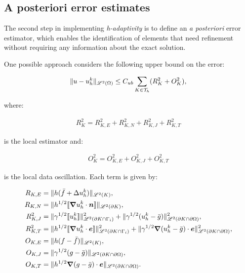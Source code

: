 \newpage
\subsection{A posteriori error estimates}

The second step in implementing \textit{h-adaptivity} is to define an \textit{a posteriori} error estimator, which enables the identification of elements that need refinement without requiring any information about the exact solution.

\cite{Cangiani2023} One possible approach considers the following upper bound on the error:

\begin{gather}
	\lVert u - u^k_h \rVert_{\mathscr{L}^2(\Omega)} \leq C_{ub} \sum_{K \in \mathcal{T}_h} (R_K^2 + O_K^2),
\end{gather}

where:

\begin{gather}
	R_K^2 = R_{K, E}^2 + R_{K, N}^2 + R_{K, J}^2 + R_{K, T}^2
\end{gather}

is the local estimator and:

\begin{gather}
	O_K^2 = O_{K, E}^2 + O_{K, J}^2 + O_{K, T}^2
\end{gather}

is the local data oscillation. Each term is given by:

\begin{align}
	R_{K, E} &= \lVert h (\bar{f} + \Delta u^k_h) \rVert_{\mathscr{L}^2(K)}, \\
	R_{K, N} &= \lVert h^{1/2} \llbracket \bm{\nabla} u^k_h \cdot \bm{n} \rrbracket \rVert_{\mathscr{L}^2(\partial K)}, \\
	R^2_{K, J} &= \lVert \gamma^{1/2} \llbracket u^k_h \rrbracket \rVert^2_{\mathscr{L}^2(\partial K \cap \Gamma_{i})} + \lVert \gamma^{1/2} (u^k_h - \bar{g}) \rVert^2_{\mathscr{L}^2(\partial K \cap \partial \Omega)}, \\
	R^2_{K, T} &= \lVert h^{1/2} \llbracket \bm{\nabla} u^k_h \cdot \bm{e} \rrbracket \rVert^2_{\mathscr{L}^2(\partial K \cap \Gamma_{i})} + \lVert \gamma^{1/2} \bm{\nabla} (u^k_h - \bar{g}) \cdot \bm{e} \rVert^2_{\mathscr{L}^2(\partial K \cap \partial \Omega)}, \\
	O_{K, E} &= \lVert h (f - \bar{f}) \rVert_{\mathscr{L}^2(K)}, \\
	O_{K, J} &= \lVert \gamma^{1/2} (g - \bar{g}) \rVert_{\mathscr{L}^2(\partial K \cap \partial \Omega)}, \\
	O_{K, T} &= \lVert h^{1/2} \bm{\nabla} (g - \bar{g}) \cdot \bm{e} \rVert_{\mathscr{L}^2(\partial K \cap \partial \Omega)}.
\end{align}

